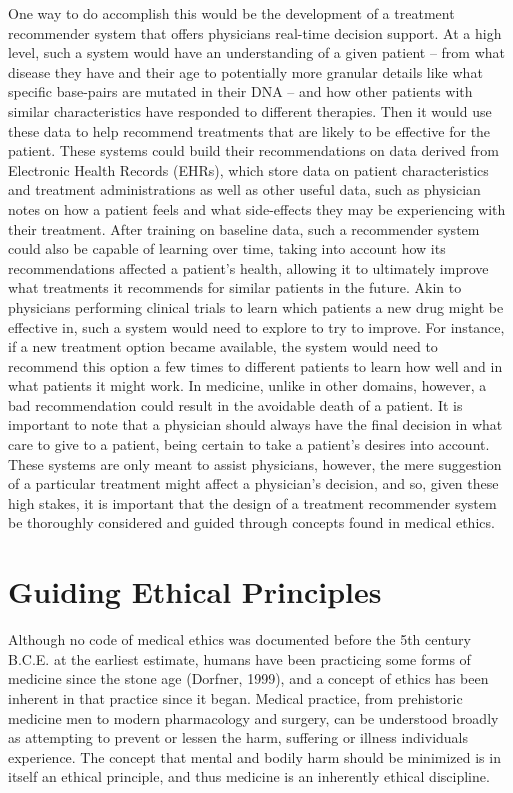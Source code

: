 \documentclass[]{spie}  %
\begin{document}
One way to do accomplish this would be the development of a treatment recommender system that offers physicians real-time decision support. At a high level, such a system would have an understanding of a given patient – from what disease they have and their age to potentially more granular details like what specific base-pairs are mutated in their DNA – and how other patients with similar characteristics have responded to different therapies. Then it would use these data to help recommend treatments that are likely to be effective for the patient. These systems could build their recommendations on data derived from Electronic Health Records (EHRs), which store data on patient characteristics and treatment administrations as well as other useful data, such as physician notes on how a patient feels and what side-effects they may be experiencing with their treatment. After training on baseline data, such a recommender system could also be capable of learning over time, taking into account how its recommendations affected a patient’s health, allowing it to ultimately improve what treatments it recommends for similar patients in the future. Akin to physicians performing clinical trials to learn which patients a new drug might be effective in, such a system would need to explore to try to improve. For instance, if a new treatment option became available, the system would need to recommend this option a few times to different patients to learn how well and in what patients it might work. In medicine, unlike in other domains, however, a bad recommendation could result in the avoidable death of a patient. It is important to note that a physician should always have the final decision in what care to give to a patient, being certain to take a patient’s desires into account. These systems are only meant to assist physicians, however, the mere suggestion of a particular treatment might affect a physician's decision, and so, given these high stakes, it is important that the design of a treatment recommender system be thoroughly considered and guided through concepts found in medical ethics.

\section{Guiding Ethical Principles}

Although no code of medical ethics was documented before the 5th century B.C.E. at the earliest estimate, humans have been practicing some forms of medicine since the stone age (Dorfner, 1999), and a concept of ethics has been inherent in that practice since it began. Medical practice, from prehistoric medicine men to modern pharmacology and surgery, can be understood broadly as attempting to prevent or lessen the harm, suffering or illness individuals experience. The concept that mental and bodily harm should be minimized is in itself an ethical principle, and thus medicine is an inherently ethical discipline.
\end{document}
